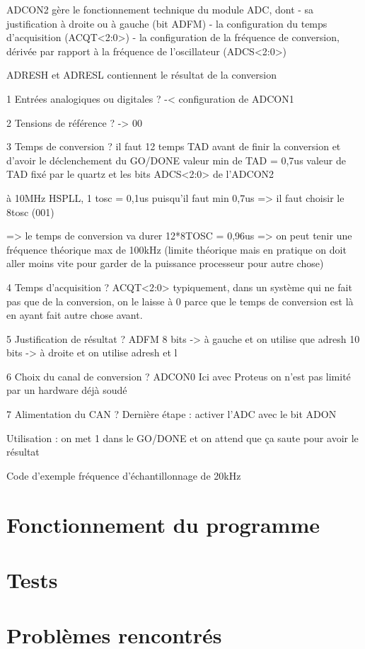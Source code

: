 \documentclass{article}
\begin{document}
    ADCON2
    gère le fonctionnement technique du module ADC, dont 
    - sa justification à droite ou à gauche (bit ADFM)
    - la configuration du temps d'acquisition (ACQT<2:0>)
    - la configuration de la fréquence de conversion, dérivée par rapport à la fréquence de l'oscillateur (ADCS<2:0>)

    ADRESH et ADRESL
    contiennent le résultat de la conversion


    1 Entrées analogiques ou digitales ? -< configuration de ADCON1

    2 Tensions de référence ? -> 00

    3 Temps de conversion ? il faut 12 temps TAD avant de finir la conversion et d'avoir le déclenchement du GO/DONE
    valeur min de TAD = 0,7us
    valeur de TAD fixé par le quartz et les bits ADCS<2:0> de l'ADCON2

    à 10MHz HSPLL, 1 tosc = 0,1us 
    puisqu'il faut min 0,7us => il faut choisir le 8tosc (001)

    => le temps de conversion va durer 12*8TOSC = 0,96us
    => on peut tenir une fréquence théorique max de 100kHz
    (limite théorique mais en pratique on doit aller moins vite pour garder de la puissance processeur pour autre chose)

    4 Temps d'acquisition ? ACQT<2:0>
    typiquement, dans un système qui ne fait pas que de la conversion, on le laisse à 0 parce que le temps de conversion est là en ayant fait autre chose avant.

    5 Justification de résultat ? ADFM 
    8 bits -> à gauche et on utilise que adresh
    10 bits -> à droite et on utilise adresh et l

    6 Choix du canal de conversion ? ADCON0
    Ici avec Proteus on n'est pas limité par un hardware déjà soudé

    7 Alimentation du CAN ?
    Dernière étape : activer l'ADC avec le bit ADON

    Utilisation : on met 1 dans le GO/DONE et on attend que ça saute pour avoir le résultat

    Code d'exemple
    fréquence d'échantillonnage de 20kHz






    \section{Fonctionnement du programme}



    \section{Tests}



    \section{Problèmes rencontrés}
\end{document}
